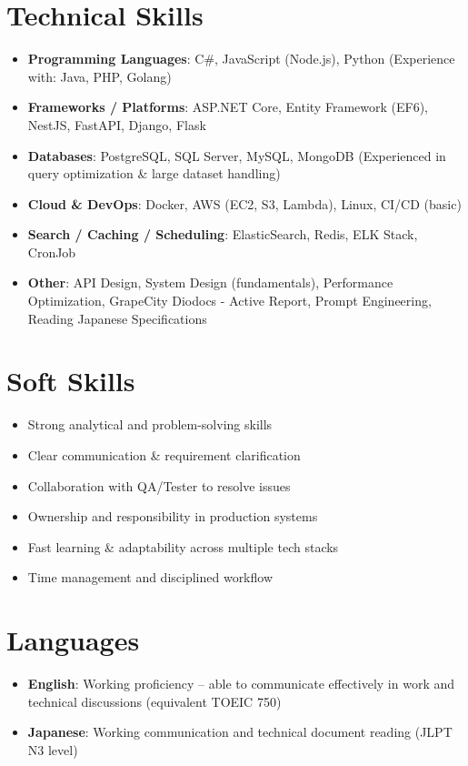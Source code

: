 \documentclass[a4paper,11pt]{article}
\newcommand{\resumeSubHeadingListStart}{\begin{itemize}[leftmargin=*]}
\newcommand{\resumeSubHeadingListEnd}{\end{itemize}}
\begin{document}
\section{Technical Skills}
 \resumeSubHeadingListStart
    \item{
     \textbf{Programming Languages}{: C\#, JavaScript (Node.js), Python (Experience with: Java, PHP, Golang)}
    }
    \item{
     \textbf{Frameworks / Platforms}{: ASP.NET Core, Entity Framework (EF6), NestJS, FastAPI, Django, Flask}
    }
    \item{
     \textbf{Databases}{: PostgreSQL, SQL Server, MySQL, MongoDB (Experienced in query optimization \& large dataset handling)}
    }
    \item{
     \textbf{Cloud \& DevOps}{: Docker, AWS (EC2, S3, Lambda), Linux, CI/CD (basic)}
    }
    \item{
     \textbf{Search / Caching / Scheduling}{: ElasticSearch, Redis, ELK Stack, CronJob}
    }
    \item{
     \textbf{Other}{: API Design, System Design (fundamentals), Performance Optimization, GrapeCity Diodocs - Active Report, Prompt Engineering, Reading Japanese Specifications}
    }
 \resumeSubHeadingListEnd

\section{Soft Skills}
 \resumeSubHeadingListStart
    \item Strong analytical and problem-solving skills
    \item Clear communication \& requirement clarification
    \item Collaboration with QA/Tester to resolve issues
    \item Ownership and responsibility in production systems
    \item Fast learning \& adaptability across multiple tech stacks
    \item Time management and disciplined workflow
 \resumeSubHeadingListEnd

\section{Languages}
 \resumeSubHeadingListStart
    \item{
     \textbf{English}{: Working proficiency – able to communicate effectively in work and technical discussions (equivalent TOEIC 750)}
    }
    \item{
     \textbf{Japanese}{: Working communication and technical document reading (JLPT N3 level)}
    }
 \resumeSubHeadingListEnd
\end{document}
